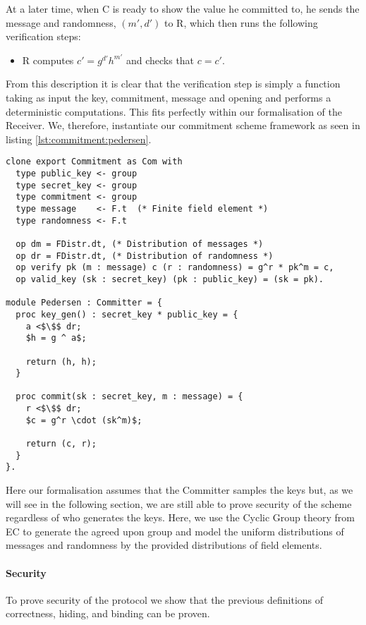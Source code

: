 At a later time, when C is ready to show the value he committed to, he sends the
message and randomness, $(m',d')$ to R, which then runs the following
verification steps:
\begin{itemize}
  \item R computes $c' = g^{d'}h^{m'}$ and checks that $c = c'$.
\end{itemize}

From this description it is clear that the verification step is simply a
function taking as input the key, commitment, message and opening and performs a
deterministic computations. This fits perfectly within our formalisation of the
Receiver. We, therefore, instantiate our commitment scheme framework as seen in
listing \ref{lst:commitment:pedersen}.

\begin{lstlisting}[mathescape,label=lst:commitment:pedersen,caption=Pedersen instantiation]
clone export Commitment as Com with
  type public_key <- group
  type secret_key <- group
  type commitment <- group
  type message    <- F.t  (* Finite field element *)
  type randomness <- F.t

  op dm = FDistr.dt, (* Distribution of messages *)
  op dr = FDistr.dt, (* Distribution of randomness *)
  op verify pk (m : message) c (r : randomness) = g^r * pk^m = c,
  op valid_key (sk : secret_key) (pk : public_key) = (sk = pk).

module Pedersen : Committer = {
  proc key_gen() : secret_key * public_key = {
    a <$\$$ dr;
    $h = g ^ a$;

    return (h, h);
  }

  proc commit(sk : secret_key, m : message) = {
    r <$\$$ dr;
    $c = g^r \cdot (sk^m)$;

    return (c, r);
  }
}.

\end{lstlisting}

Here our formalisation assumes that the Committer samples the keys but, as we
will see in the following section, we are still able to prove security of the
scheme regardless of who generates the keys.
Here, we use the Cyclic Group theory from EC to generate the agreed upon group
and model the uniform distributions of messages and randomness by the provided
distributions of field elements.

\paragraph{Security}
To prove security of the protocol we show that the previous definitions of
correctness, hiding, and binding can be proven.

